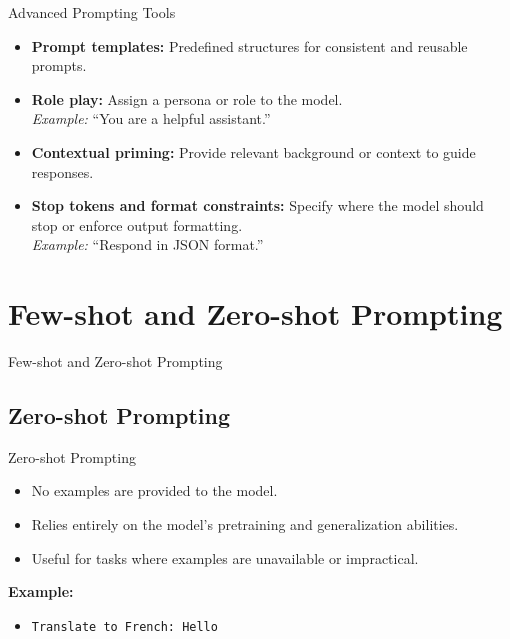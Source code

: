 \begin{frame}{Advanced Prompting Tools}
    \begin{itemize}
        \setlength{\itemsep}{1em}
        \item \textbf{Prompt templates:} Predefined structures for consistent and reusable prompts.
        \item \textbf{Role play:} Assign a persona or role to the model.\\
        \textit{Example:} ``You are a helpful assistant.''
        \item \textbf{Contextual priming:} Provide relevant background or context to guide responses.
        \item \textbf{Stop tokens and format constraints:} Specify where the model should stop or enforce output formatting.\\
        \textit{Example:} ``Respond in JSON format.''
    \end{itemize}
\end{frame}


\section{Few-shot and Zero-shot Prompting}
\begin{frame}{}
    \LARGE Few-shot and Zero-shot Prompting
\end{frame}


\subsection{Zero-shot Prompting}
\begin{frame}{Zero-shot Prompting}
    \begin{itemize}
        \setlength{\itemsep}{1em}
        \item No examples are provided to the model.
        \item Relies entirely on the model's pretraining and generalization abilities.
        \item Useful for tasks where examples are unavailable or impractical.
    \end{itemize}
    \vspace{1em}
    \textbf{Example:}
    \begin{itemize}
        \item \texttt{Translate to French: Hello}
    \end{itemize}
\end{frame}


